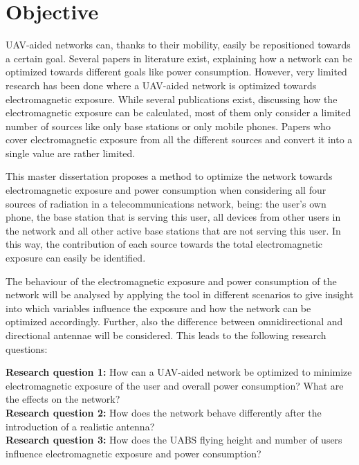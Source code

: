 \section{Objective}
\label{sec:objective}

\gls{UAV}-aided networks can, thanks to their mobility, easily be repositioned towards a certain goal. Several papers 
in literature exist, explaining how a network can be optimized towards different goals like power consumption.
However, very limited
research has been done where a \gls{UAV}-aided network is optimized towards electromagnetic exposure.
While several publications exist, discussing how the electromagnetic exposure can be calculated, most of them only consider a limited number of sources like only base stations or only mobile phones.
Papers who cover electromagnetic exposure from all the different sources and convert it into a single value are rather limited.

This master dissertation proposes a method to optimize the network towards electromagnetic exposure and power consumption
when considering all four sources of radiation in a telecommunications network, being: the user's own phone, 
the base station that is serving this user, 
all devices from other users in the network and all 
other active base stations that are not serving this user. In this way, the contribution of each source towards the total 
electromagnetic exposure can easily be identified. 

The behaviour of the electromagnetic exposure and power consumption of the network will be analysed by applying the tool in different scenarios 
to give insight into which variables influence the exposure and how
the network can be optimized accordingly. Further, also the difference between omnidirectional and directional antennae will 
be considered. This leads to the following research questions:

\textbf{Research question 1:} How can a  \acs{UAV}-aided network be optimized to minimize electromagnetic exposure of the user and overall power consumption? 
What are the effects on the network?\\

\textbf{Research question 2:} How does the network behave differently after the introduction of a realistic antenna?\\

\textbf{Research question 3:} How does the \gls{UABS} flying height and number of users influence
electromagnetic exposure and power consumption?\\

